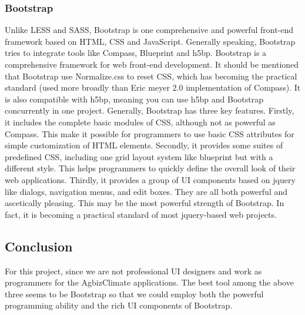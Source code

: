\documentclass[letterpaper,10pt]{article}
\begin{document}
		\subsubsection{Bootstrap}
    Unlike LESS and SASS, Bootstrap is one comprehensive and powerful front-end framework based on HTML, CSS and JavaScript. Generally speaking, Bootstrap tries to integrate tools like Compass, Blueprint and h5bp. Bootstrap is a comprehensive framework for web front-end development. It should be mentioned that Bootstrap use Normalize.css to reset CSS, which has becoming the practical standard (used more broadly than Eric meyer 2.0 implementation of Compass). It is also compatible with h5bp, meaning you can use h5bp and Bootstrap concurrently in one project. Generally, Bootstrap has three key features. Firstly, it includes the complete basic modules of CSS, although not as powerful as Compass. This make it possible for programmers to use basic CSS attributes for simple customization of HTML elements. Secondly, it provides some suites of predefined CSS, including one grid layout system like blueprint but with a different style. This helps programmers to quickly define the overall look of their web applications. Thirdly, it provides a group of UI components based on jquery like dialogs, navigation menus, and edit boxes. They are all both powerful and ascetically pleasing. This may be the most powerful strength of Bootstrap. In fact, it is becoming a practical standard of most jquery-based web projects.

	\subsection{Conclusion}
      For this project, since we are not professional UI designers and work as programmers for the AgbizClimate applications. The best tool among the above three seems to be Bootstrap so that we could employ both the powerful programming ability and the rich UI components of Bootstrap.
\end{document}
